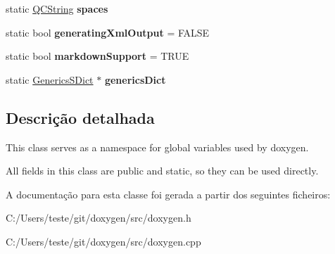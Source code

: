 \begin{DoxyCompactItemize}
\item 
\hypertarget{class_doxygen_abcf012de2672e6bbcf0a98a08bf8bbef}{static \hyperlink{class_q_c_string}{Q\-C\-String} {\bfseries spaces}}\label{class_doxygen_abcf012de2672e6bbcf0a98a08bf8bbef}

\item 
\hypertarget{class_doxygen_a2e9f7d58d05cbea6b34b92dcae8b2ad9}{static bool {\bfseries generating\-Xml\-Output} = F\-A\-L\-S\-E}\label{class_doxygen_a2e9f7d58d05cbea6b34b92dcae8b2ad9}

\item 
\hypertarget{class_doxygen_aed3d5eae313cfe56a7f187b303d0a858}{static bool {\bfseries markdown\-Support} = T\-R\-U\-E}\label{class_doxygen_aed3d5eae313cfe56a7f187b303d0a858}

\item 
\hypertarget{class_doxygen_a0b13eadb3cb65ea3858590f394e006f2}{static \hyperlink{class_generics_s_dict}{Generics\-S\-Dict} $\ast$ {\bfseries generics\-Dict}}\label{class_doxygen_a0b13eadb3cb65ea3858590f394e006f2}

\end{DoxyCompactItemize}


\subsection{Descrição detalhada}
This class serves as a namespace for global variables used by doxygen. 

All fields in this class are public and static, so they can be used directly. 

A documentação para esta classe foi gerada a partir dos seguintes ficheiros\-:\begin{DoxyCompactItemize}
\item 
C\-:/\-Users/teste/git/doxygen/src/doxygen.\-h\item 
C\-:/\-Users/teste/git/doxygen/src/doxygen.\-cpp\end{DoxyCompactItemize}
